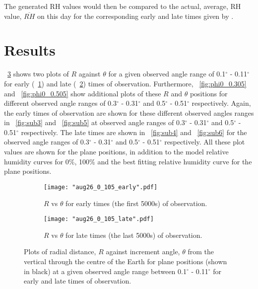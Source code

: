 \documentclass{article}
\newcommand{\figref}[2][\figurename~]{#1\ref{#2}}
\begin{document}
\vspace{2mm}
\noindent
The generated RH values would then be compared to the actual, average, RH value, $\overline{RH}$ on this day for the corresponding early and late times given by \cite{Web01}.


\section{Results}
\label{sec:results}
\figref{fig:phi0_0.105} shows two plots of $R$ against $\theta$ for a given observed angle range of 0.1$^{\circ}$ - 0.11$^{\circ}$ for early (\figref{fig:sub1}) and late (\figref{fig:sub2}) times of observation. Furthermore, \figref{fig:phi0_0.305} and \figref{fig:phi0_0.505} show additional plots of these $R$ and $\theta$ positions for different observed angle ranges of 0.3$^{\circ}$ - 0.31$^{\circ}$ and 0.5$^{\circ}$ - 0.51$^{\circ}$ respectively. Again, the early times of observation are shown for these different observed angles ranges in \figref{fig:sub3} and \figref{fig:sub5} at observed angle ranges of 0.3$^{\circ}$ - 0.31$^{\circ}$ and 0.5$^{\circ}$ - 0.51$^{\circ}$ respectively. The late times are shown in \figref{fig:sub4} and \figref{fig:sub6} for the observed angle ranges of 0.3$^{\circ}$ - 0.31$^{\circ}$ and 0.5$^{\circ}$ - 0.51$^{\circ}$ respectively. All these plot values are shown for the plane positions, in addition to the model relative humidity curves for 0$\%$, 100$\%$ and the best fitting relative humidity curve for the plane positions.


\begin{figure}[h]
\centering
\begin{subfigure}{.5\textwidth}
  \centering
  \texttt{[image: "aug26\_0\_105\_early".pdf]}
  \caption{$R$ vs $\theta$ for early times (the first 5000s) of observation.}
  \label{fig:sub1}
\end{subfigure}%
\begin{subfigure}{.5\textwidth}
  \centering
  \texttt{[image: "aug26\_0\_105\_late".pdf]}
  \caption{$R$ vs $\theta$ for late times (the last 5000s) of observation.}
  \label{fig:sub2}
\end{subfigure}
\caption{Plots of radial distance, $R$ against increment angle, $\theta$ from the vertical through the centre of the Earth for plane positions (shown in black) at a given observed angle range between 0.1$^{\circ}$ - 0.11$^{\circ}$ for early and late times of observation.}
\label{fig:phi0_0.105}
\end{figure}
\end{document}
